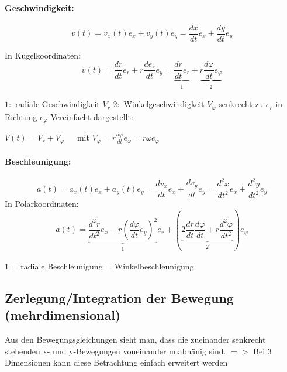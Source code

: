 \documentclass[7pt]{article}
\begin{document}
\begin{multicols}{3}
\paragraph{Geschwindigkeit:}
\begin{equation*}
v(t) = v_x(t)e_x + v_y(t)e_y = \frac{dx}{dt}e_x +\frac{dy}{dt}e_y 
\end{equation*}

In Kugelkoordinaten:
\begin{equation*}\label{eq:dN}
v(t) = \frac{dr}{dt}e_r + r\frac{de_r}{dt}e_y = \underbrace{\frac{dr}{dt}e_r}_{\substack{1}} + \underbrace{r\frac{d{\varphi}}{dt}e_{\varphi}}_{\substack{2}}
\end{equation*}

$1:$ radiale Geschwindigkeit $V_r$ \newline
$2:$ Winkelgeschwindigkeit $V_{\varphi}$ senkrecht zu $e_r$ in Richtung $e_{\varphi}$
\newline
\newline
Vereinfacht dargestellt:

$V(t) = V_r + V_{\varphi}$
$\>\>\>\>$ mit 
$V_{\varphi} = r\frac{d{\varphi}}{dt}e_{\varphi} = r{\omega}e_{\varphi}$

\paragraph{Beschleunigung:}
\begin{equation*}
a(t) = a_x(t)e_x + a_y(t)e_y = \frac{dv_x}{dt}e_x + \frac{dv_y}{dt}e_y = \frac{d^2x}{dt^2}e_x + \frac{d^2y}{dt^2}e_y
\end{equation*}\newline
In Polarkoordinaten:
\begin{equation*}
a(t) = \underbrace{\frac{d^2r}{dt^2}e_x - r\left(\frac{d\varphi}{dt}e_y\right)^2}_{\substack{1}}e_r + \left(\underbrace{2 \frac{dr}{dt}\frac{d\varphi}{dt}+r\frac{d^2\varphi}{dt^2}}_{\substack{2}}\right)e_\varphi
\end{equation*}

1 = radiale Beschleunigung  = Winkelbeschleunigung
\newline

\subsection{Zerlegung/Integration der Bewegung (mehrdimensional)}
Aus den Bewegungsgleichungen sieht man, dass die zueinander senkrecht stehenden x- und y-Bewegungen voneinander unabh{\"a}nig sind.
\newline
$=>$ Bei 3 Dimensionen kann diese Betrachtung einfach erweitert werden


\end{multicols}
\end{document}
